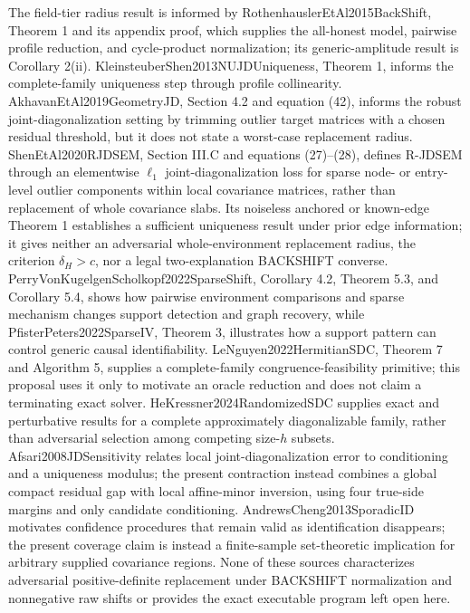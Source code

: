 \documentclass{article}
\begin{document}
The field-tier radius result is informed by RothenhauslerEtAl2015BackShift, Theorem 1 and its appendix proof, which supplies the all-honest model, pairwise profile reduction, and cycle-product normalization; its generic-amplitude result is Corollary 2(ii). KleinsteuberShen2013NUJDUniqueness, Theorem 1, informs the complete-family uniqueness step through profile collinearity. AkhavanEtAl2019GeometryJD, Section 4.2 and equation (42), informs the robust joint-diagonalization setting by trimming outlier target matrices with a chosen residual threshold, but it does not state a worst-case replacement radius. ShenEtAl2020RJDSEM, Section III.C and equations (27)--(28), defines R-JDSEM through an elementwise \(\ell_1\) joint-diagonalization loss for sparse node- or entry-level outlier components within local covariance matrices, rather than replacement of whole covariance slabs. Its noiseless anchored or known-edge Theorem 1 establishes a sufficient uniqueness result under prior edge information; it gives neither an adversarial whole-environment replacement radius, the criterion \(\delta_H>c\), nor a legal two-explanation BACKSHIFT converse. PerryVonKugelgenScholkopf2022SparseShift, Corollary 4.2, Theorem 5.3, and Corollary 5.4, shows how pairwise environment comparisons and sparse mechanism changes support detection and graph recovery, while PfisterPeters2022SparseIV, Theorem 3, illustrates how a support pattern can control generic causal identifiability. LeNguyen2022HermitianSDC, Theorem 7 and Algorithm 5, supplies a complete-family congruence-feasibility primitive; this proposal uses it only to motivate an oracle reduction and does not claim a terminating exact solver. HeKressner2024RandomizedSDC supplies exact and perturbative results for a complete approximately diagonalizable family, rather than adversarial selection among competing size-\(h\) subsets. Afsari2008JDSensitivity relates local joint-diagonalization error to conditioning and a uniqueness modulus; the present contraction instead combines a global compact residual gap with local affine-minor inversion, using four true-side margins and only candidate conditioning. AndrewsCheng2013SporadicID motivates confidence procedures that remain valid as identification disappears; the present coverage claim is instead a finite-sample set-theoretic implication for arbitrary supplied covariance regions. None of these sources characterizes adversarial positive-definite replacement under BACKSHIFT normalization and nonnegative raw shifts or provides the exact executable program left open here.
\end{document}
